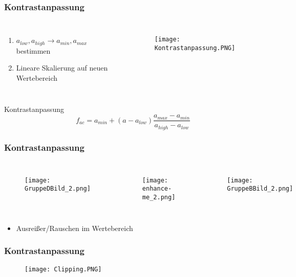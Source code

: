 \documentclass[14pt]{beamer}
\begin{document}
\begin{frame}
	\frametitle{Kontrastanpassung}	
	\begin{columns}
		\begin{enumerate}
			\item $a_{low}, a_{high} \rightarrow a_{min}, a_{max}$ bestimmen
			\item Lineare Skalierung auf neuen Wertebereich 
		\end{enumerate}	
		\begin{figure}
			\centering
			\texttt{[image: Kontrastanpassung.PNG]}
		\end{figure}
	\end{columns}

	\begin{block}{Kontrastanpassung}
		\begin{equation*}
		f_{ac}=a_{min} + (a - a_{low}) \frac{a_{max}-a_{min}}{a_{high}-a_{low}}
		\end{equation*}
	\end{block}		
		
	\end{frame}

\begin{frame}
	\frametitle{Kontrastanpassung}
	\begin{columns}[c]
		\column{.3\textwidth}
		\begin{figure}
			\texttt{[image: GruppeDBild\_2.png]}
		\end{figure}
		\column{.3\textwidth}
		\begin{figure}
			\texttt{[image: enhance-me\_2.png]}
		\end{figure}
		\column{.3\textwidth}
		\begin{figure}
			\texttt{[image: GruppeBBild\_2.png]}
		\end{figure}		 	
	\end{columns}	
	\begin{itemize}
		\item Ausreißer/Rauschen im Wertebereich
	\end{itemize}
\end{frame}

\begin{frame}
	\frametitle{Kontrastanpassung}
	\begin{figure}
		\centering
		\texttt{[image: Clipping.PNG]}
	\end{figure}
\end{frame}
\end{document}
